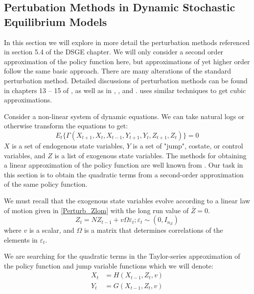 \documentclass[letterpaper,12pt]{article}
\newcommand{\ve}{\varepsilon}
\theoremstyle{definition}
\begin{document}
\begin{spacing}{1.5}
\section{Pertubation Methods in Dynamic Stochastic Equilibrium Models} \label{Perturb_Dynamic}
	In this section we will explore in more detail the perturbation methods referenced in section 5.4 of the DSGE chapter. We will only consider a second order approximation of the policy function here, but approximations of yet higher order follow the same basic approach. There are many alterations of the standard perturbation method. Detailed discussions of perturbation methods can be found in chapters  13 -- 15 of \citet{Judd:1998}, as well as in \citet{CollardJuilliard2001}, \citet{SchmittGroheUribe2004}, \citet{HeerMaussner:2009} and \citet{GommeKlein:2011}.  \citet{Binning:2012} uses similar techniques to get cubic approximations.

	Consider a non-linear system of dynamic equations.  We can take natural logs or otherwise transform the equations to get:
	\begin{equation} \label{Perturb_Gamfunc}
	E_t\{\Gamma (X_{t+1},X_t,X_{t-1},Y_{t+1},Y_t,Z_{t+1},Z_t)\} = 0
	\end{equation}
	$X$ is a set of endogenous state variables, $Y$ is a set of "jump", costate, or control variables, and $Z$ is a list of exogenous state variables.  The methods for obtaining a linear approximation of the policy function are well known from \citet{Uhlig1999}.  Our task in this section is to obtain the quadratic terms from a second-order approximation of the same policy function.

	We must recall that the exogenous state variables evolve according to a linear law of motion given in \eqref{Perturb_Zlom} with the long run value of $\bar Z = 0$.
	\begin{equation} \label{Perturb_Zlom}
	Z_t = N Z_{t-1} + v \Omega \ve_t; \ve_t \sim (0,I_{n_Z}) 
	\end{equation}
	where $v$ is a scalar, and $\Omega$ is a matrix that determines correlations of the elements in $\ve_t$.

	We are searching for the quadratic terms in the Taylor-series approximation of the policy function and jump variable functions which we will denote:
	\begin{align}
		X_{t} & = H(X_{t-1},Z_t,v) \label{Perturb_Hfunc} \\
		Y_{t} & = G(X_{t-1},Z_t,v) \label{Perturb_Gfunc}
	\end{align}


\end{spacing}
\end{document}

